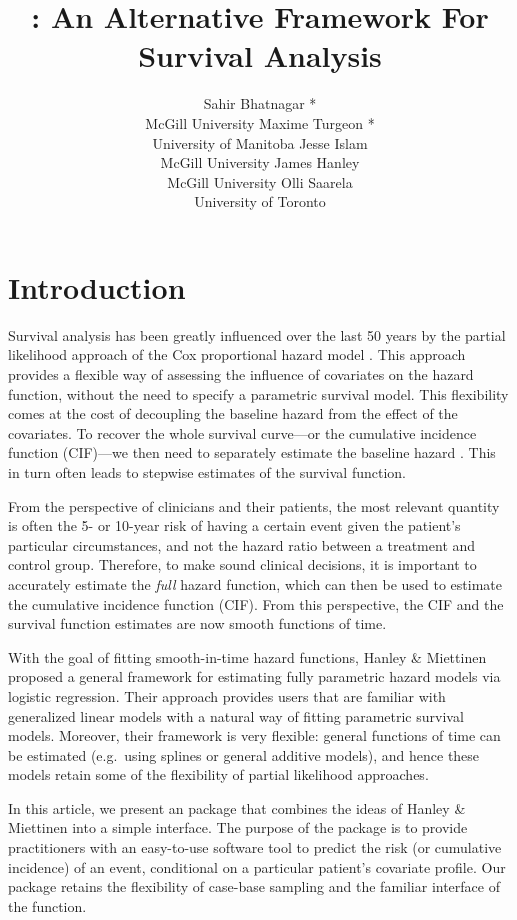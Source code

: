 \documentclass[
]{jss}
\author{
Sahir Bhatnagar *\\McGill University \And Maxime Turgeon *\\University of Manitoba \AND Jesse Islam\\McGill University \And James Hanley\\McGill University \And Olli Saarela\\University of Toronto
}
\title{\pkg{casebase}: An Alternative Framework For Survival Analysis}
\begin{document}
\hypertarget{introduction}{%
\section{Introduction}\label{introduction}}

Survival analysis has been greatly influenced over the last 50 years by
the partial likelihood approach of the Cox proportional hazard model
\citep{cox1972regression}. This approach provides a flexible way of
assessing the influence of covariates on the hazard function, without
the need to specify a parametric survival model. This flexibility comes
at the cost of decoupling the baseline hazard from the effect of the
covariates. To recover the whole survival curve---or the cumulative
incidence function (CIF)---we then need to separately estimate the
baseline hazard \citep{breslow1972discussion}. This in turn often leads
to stepwise estimates of the survival function.

From the perspective of clinicians and their patients, the most relevant
quantity is often the 5- or 10-year risk of having a certain event given
the patient's particular circumstances, and not the hazard ratio between
a treatment and control group. Therefore, to make sound clinical
decisions, it is important to accurately estimate the \emph{full} hazard
function, which can then be used to estimate the cumulative incidence
function (CIF). From this perspective, the CIF and the survival function
estimates are now smooth functions of time.

With the goal of fitting smooth-in-time hazard functions, Hanley \&
Miettinen \citeyearpar{hanley2009fitting} proposed a general framework
for estimating fully parametric hazard models via logistic regression.
Their approach provides users that are familiar with generalized linear
models with a natural way of fitting parametric survival models.
Moreover, their framework is very flexible: general functions of time
can be estimated (e.g.~using splines or general additive models), and
hence these models retain some of the flexibility of partial likelihood
approaches.

In this article, we present an  package that combines the
ideas of Hanley \& Miettinen into a simple interface. The purpose of the
 package is to provide practitioners with an easy-to-use
software tool to predict the risk (or cumulative incidence) of an event,
conditional on a particular patient's covariate profile. Our package
retains the flexibility of case-base sampling and the familiar interface
of the  function.
\end{document}
